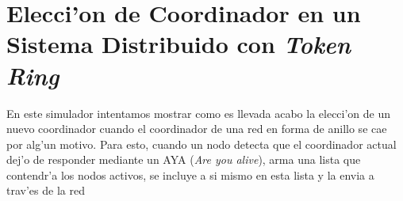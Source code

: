 \section{Elecci'on de Coordinador en un Sistema Distribuido con \emph{Token Ring}}
En este simulador intentamos mostrar como es llevada acabo la elecci'on de un nuevo coordinador cuando el coordinador de una red en forma de anillo se cae por alg'un motivo.
Para esto, cuando un nodo detecta que el coordinador actual dej'o de responder mediante un AYA (\emph{Are you alive}), arma una lista que contendr'a los nodos activos, se incluye a si mismo en esta lista y la envia a trav'es de la red

